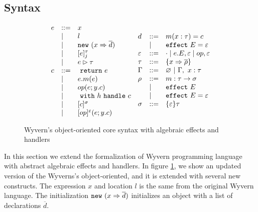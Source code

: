 \subsection{Syntax}
\begin{figure}[htb]
\footnotesize{
\[
\begin{array}{lll}
\begin{array}{lllr}
e & ::= & x \\
& | & l\\
& | & \mathtt{new}~(x \Rightarrow \overline{d}) \\
& | & [e]_j^\tau\\
& | & e \rhd \tau\\

c & ::= & \ \texttt{return}\  e\\
& | & e.m(e)\\
& | & op(e; y.c)\\
& | & \ \texttt{with}\  h \ \texttt{handle}\  c\\
& | & [c]^\sigma\\
& | &[op]^\varepsilon(e; y.c)


\end{array}
\begin{array}{lllr}
d & ::= & m(x:\tau) = c \\
& |   & \mathtt{effect}~ E =  \varepsilon \\
\varepsilon & ::= & \cdot \mid e.E, \varepsilon \mid op, \varepsilon\\
\tau & ::= & \{ x \Rightarrow \overline{\rho} \} \\
\Gamma & :: = & \varnothing~|~\Gamma,~x : \tau \\
\rho & ::= & m : \tau \rightarrow \sigma \\
       & |   & \mathtt{effect}~ E \\
       & |   & \mathtt{effect}~ E = \varepsilon  \\
\sigma & ::= & \{\varepsilon\}\tau \\
\end{array}
\end{array}
\]
}
\caption{Wyvern's object-oriented core syntax with algebraic effects and handlers}
\label{fig-wyv}
\end{figure}


In this section we extend the formalization of Wyvern programming language with abstract algebraic effects and handlers. In figure \ref{fig-wyv}, we show an updated version of the Wyverns's object-oriented, and it is extended with several new constructs.  The expression $x$ and location $l$ is the same from the original Wyvern language. The initialization $\mathtt{new}~(x \Rightarrow \overline{d})$ initializes an object with a list of declarations $\overline{d}$. 

